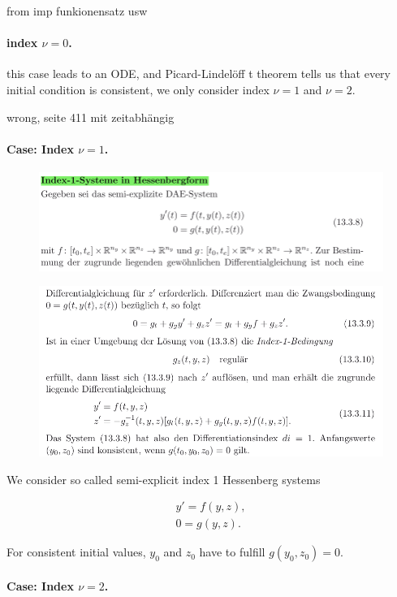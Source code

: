 from imp funkionensatz usw

\paragraph{index $\nu = 0$. } this case leads to an ODE, and Picard-Lindelöff t theorem  tells us that every initial condition is consistent, we only consider index $\nu = 1$ and $\nu = 2$.

wrong, seite 411 mit zeitabhängig

\paragraph{Case: Index $\nu = 1$.}

\begin{figure}
	\centering
	\includegraphics[width=0.7\linewidth]{screenshot020}
	\caption{}
\end{figure}
\begin{figure}
	\centering
	\includegraphics[width=0.7\linewidth]{screenshot030}
	\caption{}
\end{figure}


We consider so called semi-explicit index 1 Hessenberg systems

\begin{align*}
	y' = f(y,z), \\
	0 = g(y,z).
\end{align*}

For consistent initial values, $y_0$ and $z_0$ have to fulfill $g(y_0, z_0) = 0$.

\paragraph{Case: Index $\nu = 2$.}


